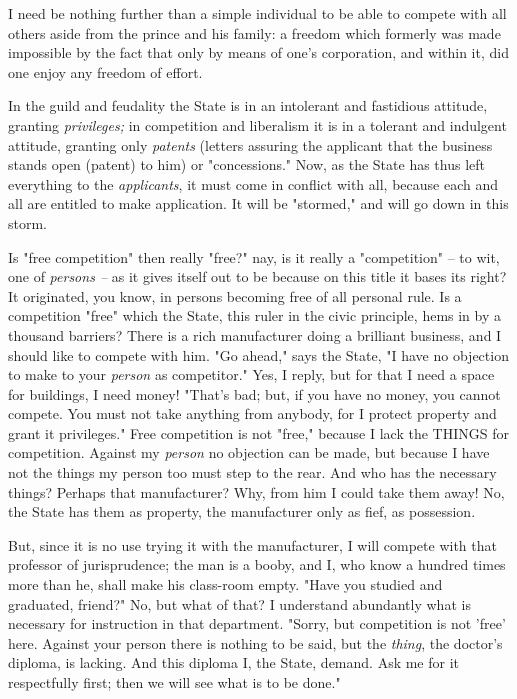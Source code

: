 I need be nothing further than a simple individual to be able to compete with 
all others aside from the prince and his family: a freedom which formerly was 
made impossible by the fact that only by means of one's corporation, and 
within it, did one enjoy any freedom of effort.

In the guild and feudality the State is in an intolerant and fastidious 
attitude, granting \textit{privileges;} in competition and liberalism it is in 
a tolerant and indulgent attitude, granting only \textit{patents} (letters 
assuring the applicant that the business stands open (patent) to him) or 
"{}concessions."{} Now, as the State has thus left everything to the 
\textit{applicants}, it must come in conflict with all, because each and all 
are entitled to make application. It will be "{}stormed,"{} and will go down 
in this storm.

Is "{}free competition"{} then really "{}free?"{} nay, is it really a 
"{}competition"{} -- to wit, one of \textit{persons --} as it gives itself out 
to be because on this title it bases its right? It originated, you know, in 
persons becoming free of all personal rule. Is a competition "{}free"{} which 
the State, this ruler in the civic principle, hems in by a thousand barriers? 
There is a rich manufacturer doing a brilliant business, and I should like to 
compete with him. "{}Go ahead,"{} says the State, "{}I have no objection to 
make to your \textit{person} as competitor."{} Yes, I reply, but for that I 
need a space for buildings, I need money! "{}That's bad; but, if you have no 
money, you cannot compete. You must not take anything from anybody, for I 
protect property and grant it privileges."{} Free competition is not 
"{}free,"{} because I lack the THINGS for competition. Against my 
\textit{person} no objection can be made, but because I have not the things my 
person too must step to the rear. And who has the necessary things? Perhaps 
that manufacturer? Why, from him I could take them away! No, the State has 
them as property, the manufacturer only as fief, as possession.

But, since it is no use trying it with the manufacturer, I will compete with 
that professor of jurisprudence; the man is a booby, and I, who know a hundred 
times more than he, shall make his class-room empty. "{}Have you studied and 
graduated, friend?"{} No, but what of that? I understand abundantly what is 
necessary for instruction in that department. "{}Sorry, but competition is not 
'free' here. Against your person there is nothing to be said, but the 
\textit{thing}, the doctor's diploma, is lacking. And this diploma I, the 
State, demand. Ask me for it respectfully first; then we will see what is to 
be done."{}

